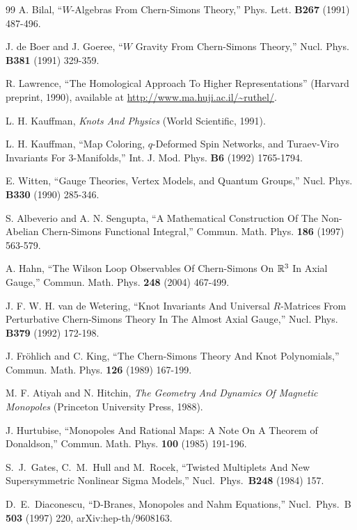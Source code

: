 \begin{thebibliography}{99}
A. Bilal, ``$W$-Algebras From Chern-Simons Theory,'' Phys. Lett. {\bf B267} (1991) 487-496.

J. de Boer and J. Goeree, 
``$W$ Gravity From Chern-Simons Theory,'' Nucl. Phys. {\bf B381} (1991)
329-359.




R. Lawrence, ``The Homological Approach To Higher Representations''
(Harvard preprint, 1990), available at \url{http://www.ma.huji.ac.il/~ruthel/}.

L. H. Kauffman, {\it Knots And Physics} (World Scientific, 1991).

L. H. Kauffman, ``Map Coloring, $q$-Deformed Spin Networks, and Turaev-Viro Invariants
For 3-Manifolds,'' Int. J. Mod. Phys. {\bf B6} (1992) 1765-1794.

E. Witten, ``Gauge Theories, Vertex Models, and Quantum Groups,'' Nucl. Phys. {\bf B330} (1990)
285-346.

S. Albeverio and A. N. Sengupta, ``A Mathematical
Construction Of The Non-Abelian Chern-Simons Functional Integral,''
Commun. Math. Phys. {\bf 186} (1997) 563-579.

A. Hahn, ``The Wilson Loop Observables Of Chern-Simons On ${\mathbb R}^3$ In Axial Gauge,''
Commun. Math. Phys. {\bf 248} (2004) 467-499.



J. F. W. H. van de Wetering, ``Knot Invariants And Universal $R$-Matrices From Perturbative
Chern-Simons Theory In The Almost Axial Gauge,'' Nucl. Phys. {\bf B379} (1992) 172-198.


J. Fr\"ohlich and C. King, ``The Chern-Simons Theory And Knot Polynomials,'' Commun. Math. Phys.
{\bf 126} (1989) 167-199.

M. F. Atiyah and N. Hitchin,  {\it The Geometry And Dynamics Of Magnetic Monopoles}
(Princeton University Press, 1988).

J. Hurtubise, ``Monopoles And Rational Maps: A Note On A Theorem
of Donaldson,''  Commun. Math. Phys. {\bf 100} (1985) 191-196.

  S.~J.~Gates, C.~M.~Hull and M.~Rocek,
  ``Twisted Multiplets And New Supersymmetric Nonlinear Sigma Models,''
  Nucl.\ Phys.\   {\bf B248} (1984) 157.

 D.~E.~Diaconescu,
  ``D-Branes, Monopoles and Nahm Equations,''
  Nucl.\ Phys.\  B {\bf 503} (1997) 220, arXiv:hep-th/9608163.



\end{thebibliography}
